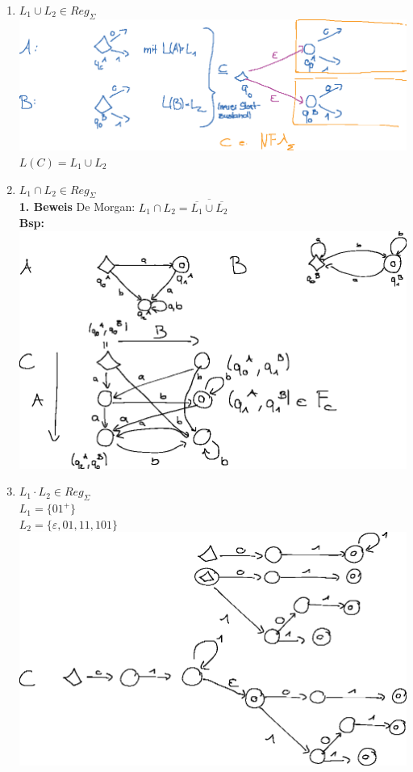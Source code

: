 \documentclass[10pt]{article}
\newcommand{\Bold}[1]{\textbf{#1}} %
\begin{document}
\begin{enumerate}
 \item $L_1\cup L_2\in Reg_\Sigma$\\
\includegraphics{Bild11.eps}\\
 $L(C)=L_1\cup L_2$
 \item $L_1\cap L_2\in Reg_\Sigma$\\
 \Bold{1. Beweis} De Morgan: $L_1\cap L_2 = \overline{\overline{L_1}\cup\overline{L_2}}$\\
 \Bold{Bsp:}\\
\includegraphics{Bild13.eps}\\
 \item $L_1\cdot L_2\in Reg_\Sigma$\\
 $L_1=\{01^+\}$\\
 $L_2=\{\varepsilon,01,11,101\}$\\
\includegraphics{Bild15.eps}\\

\end{enumerate}
\end{document}
